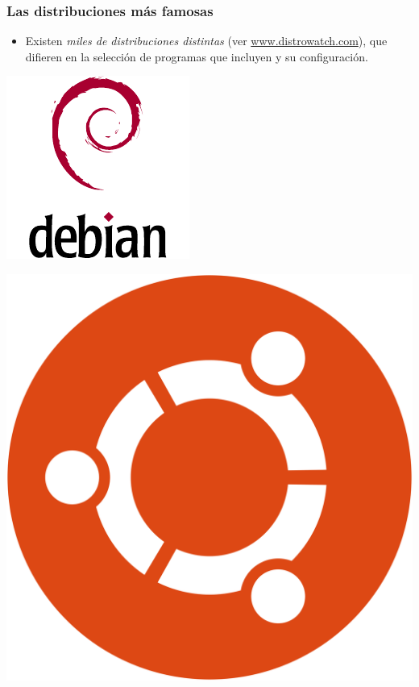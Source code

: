\documentclass[hyperref={colorlinks}]{beamer}
\begin{document}
\begin{frame}
    \frametitle{Las distribuciones m\'as famosas}
    \begin{itemize}
    \item Existen \textit{miles de distribuciones distintas} (ver \url{www.distrowatch.com}), que difieren en la selecci\'on de programas que incluyen y su configuraci\'on.
    \end{itemize}

    \begin{minipage}[b][.30\textheight][t]{.3\textwidth}
    \includegraphics[width=.7\textwidth]{figs/logo-debian.pdf}\\
    \end{minipage}\hfill
    \begin{minipage}[b][.30\textheight][t]{.3\textwidth}
    \includegraphics[width=.7\textwidth]{figs/logo-ubuntu.png}\\

\end{minipage}
\end{frame}
\end{document}
